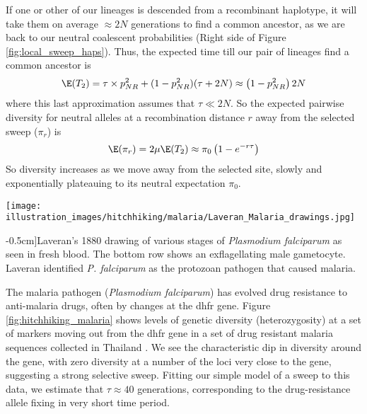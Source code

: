 If one or other of our lineages is descended from a recombinant haplotype, it will take them on average
$\approx 2N$ generations to find a common ancestor, as we are back to our
neutral coalescent probabilities (Right side of Figure \ref{fig:local_sweep_haps}). Thus, the expected time
till our pair of lineages find a common ancestor is
\begin{equation}
\E(T_2)  = \tau \times p_{NR}^2 +(1-p_{NR}^2) (\tau +2N) \approx
\left(1-p_{NR}^2 \right) 2N
\end{equation}
where this last approximation assumes that $\tau \ll 2N$. So the
expected pairwise diversity for neutral alleles at a recombination
distance $r$ away from the selected sweep ($\pi_r$) is
\begin{equation}
\E(\pi_r) = 2\mu \E(T_2)  \approx \pi_0 \left(1-e^{-r\tau} \right) \label{eqn:pi_HH}
\end{equation}
So diversity increases as we move away from the selected site,
slowly and exponentially plateauing to its neutral expectation
$\pi_0$.\\
\begin{marginfigure}
\begin{center}
\texttt{[image: illustration\_images/hitchhiking/malaria/Laveran\_Malaria\_drawings.jpg]}
\end{center}
\caption[][-0.5cm]{Laveran's 1880 drawing of various stages of {\it Plasmodium
    falciparum} as seen in fresh blood. The bottom row shows an
  exflagellating male gametocyte. Laveran identified {\it P. falciparum} as the
  protozoan pathogen that caused malaria. } \label{fig:malaria}
\end{marginfigure}

The malaria pathogen ({\it Plasmodium falciparum}) has
evolved drug resistance to anti-malaria drugs, often by changes at
the dhfr gene. Figure \ref{fig:hitchhiking_malaria} shows levels of
genetic diversity (heterozygosity) at a set of markers moving out from the dhfr gene in a
set of  drug resistant malaria sequences collected in
Thailand \citep{nash2005selection}. We see the characteristic dip in diversity around the gene,
with zero diversity at a number of the loci very close to the gene,
suggesting a strong selective sweep. Fitting our simple model of a
sweep to this data,  we estimate that $\tau \approx 40$ generations,
corresponding to the drug-resistance allele fixing in very short time period. 

